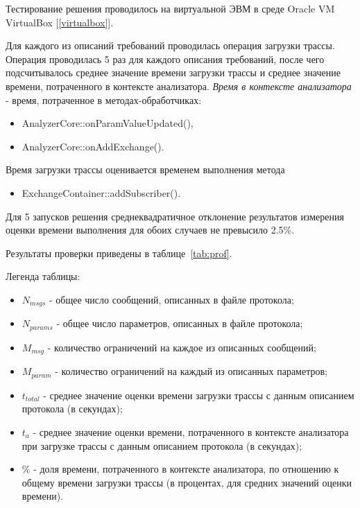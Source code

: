 Тестирование решения проводилось на виртуальной ЭВМ в среде Oracle VM 
VirtualBox [\ref{virtualbox}].

Для каждого из описаний требований проводилась операция загрузки трассы. 
Операция проводилась 5 раз для каждого описания требований, после чего 
подсчитывалось среднее значение времени загрузки трассы и среднее значение 
времени, потраченного в контексте анализатора. \textit{Время в контексте 
анализатора} - время, потраченное в методах-обработчиках:
\begin{itemize}
 \item AnalyzerCore::onParamValueUpdated(),
 \item AnalyzerCore::onAddExchange(). 
\end{itemize}

Время загрузки трассы оценивается временем выполнения метода 

\begin{itemize}
 \item ExchangeContainer::addSubscriber().
\end{itemize}

Для 5 запусков решения среднеквадратичное отклонение результатов 
измерения оценки времени выполнения для обоих случаев не превысило 2.5\%.

Результаты проверки приведены в таблице~\ref{tab:prof}.

Легенда таблицы:

\begin{itemize}
 \item $N_{msgs}$ - общее число сообщений, описанных в файле протокола;
 \item $N_{params}$ - общее число параметров, описанных в файле протокола;
 \item $M_{msg}$ - количество ограничений на каждое из описанных сообщений;
 \item $M_{param}$ - количество ограничений на каждый из описанных параметров;
 \item $t_{total}$ - среднее значение оценки времени загрузки трассы с данным 
описанием протокола (в секундах);
 \item $t_{a}$ - среднее значение оценки времени, потраченного в контексте 
анализатора при загрузке трассы с данным описанием протокола (в секундах);
 \item $\%$ - доля времени, потраченного в контексте анализатора, по 
отношению к общему времени загрузки трассы (в процентах, для средних значений 
оценки времени).
\end{itemize}


